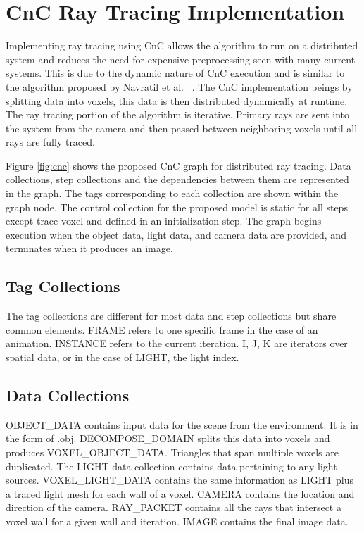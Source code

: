 \documentclass{vgtc}                          %
\begin{document}
\section{CnC Ray Tracing Implementation}
Implementing ray tracing using CnC allows the algorithm to run on a distributed system and reduces the need for expensive preprocessing seen with many current systems.  This is due to the dynamic nature of CnC execution and is similar to the algorithm proposed by Navratil et al. ~\cite{navratil2014dynamic}.  The CnC implementation beings by splitting data into voxels, this data is then distributed dynamically at runtime.  The ray tracing portion of the algorithm is iterative.  Primary rays are sent into the system from the camera and then passed between neighboring voxels until all rays are fully traced.

Figure \ref{fig:cnc} shows the proposed CnC graph for distributed ray tracing.  Data collections, step collections and the dependencies between them are represented in the graph.  The tags corresponding to each collection are shown within the graph node.  The control collection for the proposed model is static for all steps except trace voxel and defined in an initialization step.  The graph begins execution when the object data, light data, and camera data are provided, and terminates when it produces an image.

\subsection{Tag Collections}

The tag collections are different for most data and step collections but share common elements.  FRAME refers to one specific frame in the case of an animation.  INSTANCE refers to the current iteration. I, J, K are iterators over spatial data, or in the case of LIGHT, the light index.

\subsection{Data Collections}

OBJECT\_DATA contains input data for the scene from the environment.  It is in the form of .obj.  DECOMPOSE\_DOMAIN splits this data into voxels and produces VOXEL\_OBJECT\_DATA.  Triangles that span multiple voxels are duplicated.  The LIGHT data collection contains data pertaining to any light sources.  VOXEL\_LIGHT\_DATA contains the same information as LIGHT plus a traced light mesh for each wall of a voxel.  CAMERA contains the location and direction of the camera.  RAY\_PACKET contains all the rays that intersect a voxel wall for a given wall and iteration.  IMAGE contains the final image data.
\end{document}
